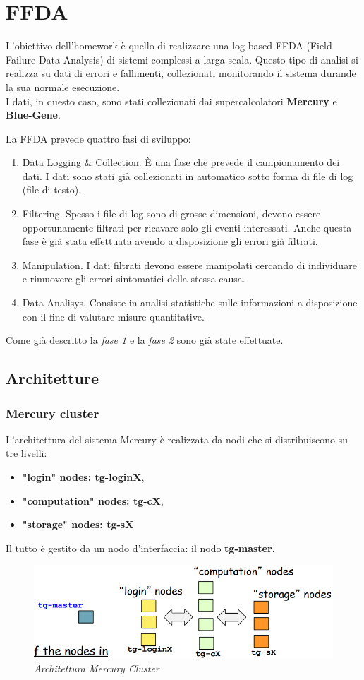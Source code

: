 \chapter{FFDA}
L'obiettivo dell'homework è quello di realizzare una log-based FFDA (Field Failure Data Analysis) di sistemi complessi a larga scala. Questo tipo di analisi si realizza su dati di errori e fallimenti, collezionati monitorando il sistema durande la sua normale esecuzione.
\\I dati, in questo caso, sono stati collezionati dai supercalcolatori \textbf{Mercury} e \textbf{Blue-Gene}. 

La FFDA prevede quattro fasi di sviluppo:
\begin{enumerate}
	\item Data Logging \& Collection. \`{E} una fase che prevede il campionamento dei dati. I dati sono stati già collezionati in automatico sotto forma di file di log (file di testo).
	\item Filtering. Spesso i file di log sono di grosse dimensioni, devono essere opportunamente filtrati per ricavare solo gli eventi interessati. Anche questa fase è già stata effettuata avendo a disposizione gli errori già filtrati.
	\item Manipulation. I dati filtrati devono essere manipolati cercando di individuare e rimuovere gli errori sintomatici della stessa causa.
	\item Data Analisys. Consiste in analisi statistiche sulle informazioni a disposizione con il fine di valutare misure quantitative.
\end{enumerate}
Come già descritto la \textit{fase 1} e la \textit{fase 2} sono già state effettuate.
\section{Architetture}
\subsection{Mercury cluster}
L'architettura del sistema Mercury è realizzata da nodi che si distribuiscono su tre livelli:
\begin{itemize}
	\item \textbf{"login" nodes: tg-loginX},
	\item \textbf{"computation" nodes: tg-cX},
	\item \textbf{"storage" nodes: tg-sX}
\end{itemize}
Il tutto è gestito da un nodo d'interfaccia: il nodo \textbf{tg-master}.
\begin{figure}[H]
	\centering
	\includegraphics[width=\textwidth]{img/hw6/mercury_a.png}
	\caption{\textit{Architettura Mercury Cluster}}
\end{figure}
